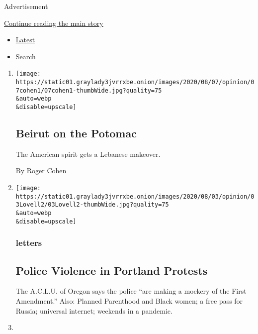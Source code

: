 Advertisement

\protect\hyperlink{after-mid1}{Continue reading the main story}

\begin{itemize}
\tightlist
\item
  \protect\hyperlink{stream-panel}{Latest}
\item
  Search
\end{itemize}

\begin{enumerate}
\def\labelenumi{\arabic{enumi}.}
\item
  \href{/2020/08/07/opinion/beirut-explosion.html}{}

  \texttt{[image: https://static01.graylady3jvrrxbe.onion/images/2020/08/07/opinion/07cohen1/07cohen1-thumbWide.jpg?quality=75\\\&auto=webp\\\&disable=upscale]}

  \hypertarget{beirut-on-the-potomac}{%
  \subsection{Beirut on the Potomac}\label{beirut-on-the-potomac}}

  The American spirit gets a Lebanese makeover.

  By Roger Cohen
\item
  \href{/2020/08/07/opinion/letters/portland-police.html}{}

  \texttt{[image: https://static01.graylady3jvrrxbe.onion/images/2020/08/03/opinion/03Lovell2/03Lovell2-thumbWide.jpg?quality=75\\\&auto=webp\\\&disable=upscale]}

  \hypertarget{letters}{%
  \subsubsection{letters}\label{letters}}

  \hypertarget{police-violence-in-portland-protests}{%
  \subsection{Police Violence in Portland
  Protests}\label{police-violence-in-portland-protests}}

  The A.C.L.U. of Oregon says the police ``are making a mockery of the
  First Amendment.'' Also: Planned Parenthood and Black women; a free
  pass for Russia; universal internet; weekends in a pandemic.
\item
  \href{/2020/08/07/opinion/letters/presidential-debates.html}{}


\end{enumerate}
